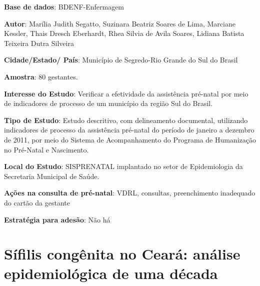 \begin{description}
\item \textbf{Base de dados}: BDENF-Enfermagem
\item \textbf{Autor}: Marília Judith Segatto, Suzinara Beatriz Soares de Lima, Marciane Kessler, Thais Dresch Eberhardt, Rhea Silvia de Avila Soares, Lidiana Batista Teixeira Dutra Silveira
\item \textbf{Cidade/Estado/ País}: Município de Segredo-Rio Grande do Sul do Brasil
\item \textbf{Amostra}: 80 gestantes.
\item \textbf{Interesse do Estudo}: Verificar a efetividade da assistência pré-natal por meio de indicadores de processo de um município da região Sul do Brasil.
\item \textbf{Tipo de Estudo}: Estudo descritivo, com delineamento documental, utilizando indicadores de processo da assistência pré-natal do período de janeiro a dezembro de 2011, por meio do Sistema de Acompanhamento do Programa de Humanização no Pré-Natal e Nascimento.
\item \textbf{Local do Estudo}: SISPRENATAL implantado no setor de Epidemiologia da Secretaria Municipal de Saúde.
\item \textbf{Ações na consulta de pré-natal}: VDRL, consultas, preenchimento inadequado do cartão da gestante
\item \textbf{Estratégia para adesão}: Não há
\end{description}

\section{Sífilis congênita no Ceará: análise epidemiológica de uma década \cite{da2013sifilis}}

